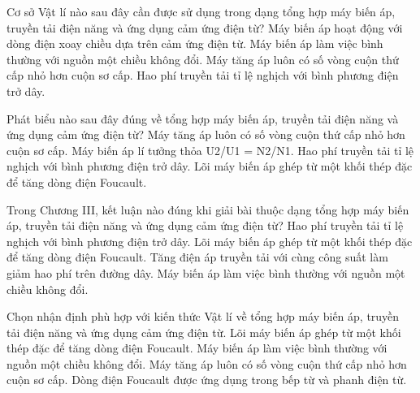 \begin{ex}
Cơ sở Vật lí nào sau đây cần được sử dụng trong dạng tổng hợp máy biến áp, truyền tải điện năng và ứng dụng cảm ứng điện từ?
\choice
{\True Máy biến áp hoạt động với dòng điện xoay chiều dựa trên cảm ứng điện từ.}
{Máy biến áp làm việc bình thường với nguồn một chiều không đổi.}
{Máy tăng áp luôn có số vòng cuộn thứ cấp nhỏ hơn cuộn sơ cấp.}
{Hao phí truyền tải tỉ lệ nghịch với bình phương điện trở dây.}
\end{ex}

\begin{ex}
Phát biểu nào sau đây đúng về tổng hợp máy biến áp, truyền tải điện năng và ứng dụng cảm ứng điện từ?
\choice
{Máy tăng áp luôn có số vòng cuộn thứ cấp nhỏ hơn cuộn sơ cấp.}
{\True Máy biến áp lí tưởng thỏa U2/U1 = N2/N1.}
{Hao phí truyền tải tỉ lệ nghịch với bình phương điện trở dây.}
{Lõi máy biến áp ghép từ một khối thép đặc để tăng dòng điện Foucault.}
\end{ex}

\begin{ex}
Trong Chương III, kết luận nào đúng khi giải bài thuộc dạng tổng hợp máy biến áp, truyền tải điện năng và ứng dụng cảm ứng điện từ?
\choice
{Hao phí truyền tải tỉ lệ nghịch với bình phương điện trở dây.}
{Lõi máy biến áp ghép từ một khối thép đặc để tăng dòng điện Foucault.}
{\True Tăng điện áp truyền tải với cùng công suất làm giảm hao phí trên đường dây.}
{Máy biến áp làm việc bình thường với nguồn một chiều không đổi.}
\end{ex}

\begin{ex}
Chọn nhận định phù hợp với kiến thức Vật lí về tổng hợp máy biến áp, truyền tải điện năng và ứng dụng cảm ứng điện từ.
\choice
{Lõi máy biến áp ghép từ một khối thép đặc để tăng dòng điện Foucault.}
{Máy biến áp làm việc bình thường với nguồn một chiều không đổi.}
{Máy tăng áp luôn có số vòng cuộn thứ cấp nhỏ hơn cuộn sơ cấp.}
{\True Dòng điện Foucault được ứng dụng trong bếp từ và phanh điện từ.}
\end{ex}

